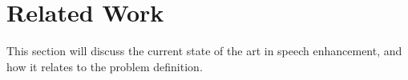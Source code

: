 \section{Related Work}
This section will discuss the current state of the art in speech enhancement, and how it relates to the problem definition.






